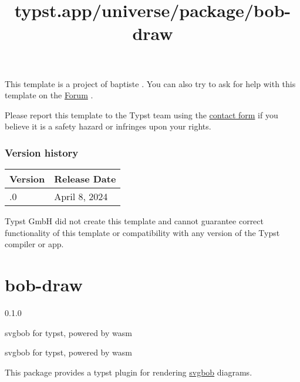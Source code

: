 This template is a project of baptiste . You can also try to ask for
help with this template on the \href{https://forum.typst.app}{Forum} .

Please report this template to the Typst team using the
\href{https://typst.app/contact}{contact form} if you believe it is a
safety hazard or infringes upon your rights.

\label{versions}
\subsubsection{Version history}\label{version-history}

\begin{longtable}[]{@{}ll@{}}
\toprule\noalign{}
Version & Release Date \\
\midrule\noalign{}
\endhead
\bottomrule\noalign{}
\endlastfoot
0.1.0 & April 8, 2024 \\
\end{longtable}

Typst GmbH did not create this template and cannot guarantee correct
functionality of this template or compatibility with any version of the
Typst compiler or app.


\title{typst.app/universe/package/bob-draw}

\label{banner}
\section{bob-draw}\label{bob-draw}

{ 0.1.0 }

svgbob for typst, powered by wasm

\label{readme}
svgbob for typst, powered by wasm

This package provides a typst plugin for rendering
\href{https://github.com/ivanceras/svgbob}{svgbob} diagrams.

\begin{Shaded}
\begin{Highlighting}[]
\NormalTok{         /\textbackslash{}\_/\textbackslash{}}
\NormalTok{ (        | |}
\NormalTok{\textasciigrave{}\textasciigrave{}\textasciigrave{})}
\end{Highlighting}
\end{Shaded}

